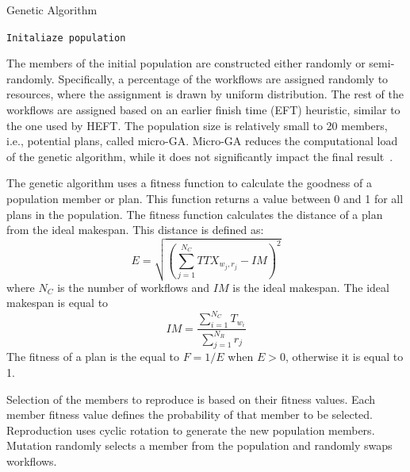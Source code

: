 \begin{algorithm}[ht]
    \caption{Genetic Algorithm}
    \label{alg:gen_algo}
    \begin{algorithmic}[1]
        \State \texttt{Initaliaze population}
        \EndWhile
        \EndProcedure
    \end{algorithmic}
\end{algorithm}

The members of the initial population are constructed either randomly or semi-randomly.
Specifically, a percentage of the workflows are assigned randomly to resources, where the assignment is drawn by uniform distribution.
The rest of the workflows are assigned based on an earlier finish time (EFT) heuristic, similar to the one used by HEFT.
The population size is relatively small to 20 members, i.e., potential plans, called micro-GA.
Micro-GA reduces the computational load of the genetic algorithm, while it does not significantly impact the final result~\cite{zomaya2001observations}.

The genetic algorithm uses a fitness function to calculate the goodness of a population member or plan.
This function returns a value between 0 and 1 for all plans in the population.
The fitness function calculates the distance of a plan from the ideal makespan.
This distance is defined as:
\begin{equation}
E = \sqrt{(\sum_{j=1}^{N_{C}}TTX_{w_{j},r_{j}} - IM)^2}
\label{eq:fitness}
\end{equation}
where $N_{C}$ is the number of workflows and $IM$ is the ideal makespan.
The ideal makespan is equal to
\begin{equation}
IM = \frac{\sum_{i=1}^{N_{C}}T_{w_{i}}}{\sum_{j=1}^{N_{R}}r_{j}}
\label{eq:ideal_fitness}
\end{equation}
The fitness of a plan is the equal to $F = 1 /E$ when $E > 0$, otherwise it is equal to 1.

Selection of the members to reproduce is based on their fitness values.
Each member fitness value defines the probability of that member to be selected.
Reproduction uses cyclic rotation to generate the new population members.
Mutation randomly selects a member from the population and randomly swaps workflows.

